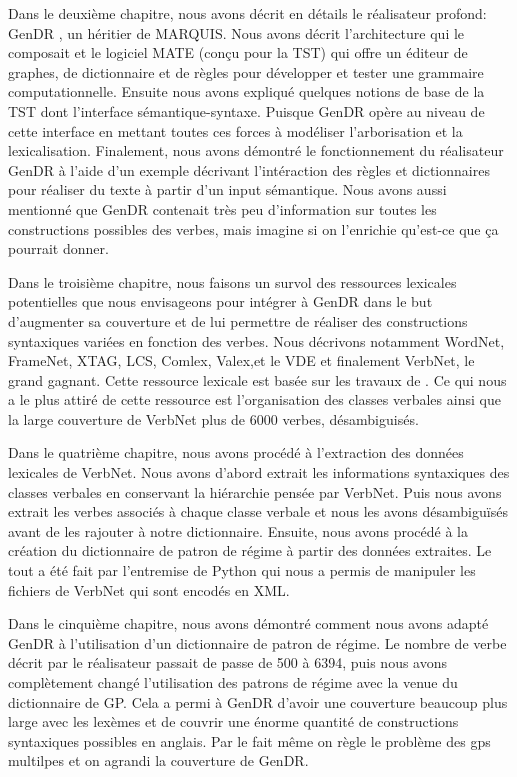 Dans le deuxième chapitre, nous avons décrit en détails le réalisateur profond: GenDR \citep{lareau18}, un héritier de MARQUIS. Nous avons décrit l'architecture qui le composait et le logiciel MATE  (conçu pour la TST) qui offre un éditeur de graphes, de dictionnaire et de règles pour développer et tester une grammaire computationnelle. Ensuite nous avons expliqué quelques notions de base de la TST dont l'interface sémantique-syntaxe. Puisque GenDR opère au niveau de cette interface en mettant toutes ces forces à modéliser l'arborisation et la lexicalisation. Finalement, nous avons démontré le fonctionnement du réalisateur GenDR à l'aide d'un exemple décrivant l'intéraction des règles et dictionnaires pour réaliser du texte à partir d'un input sémantique. Nous avons aussi mentionné que GenDR contenait très peu d'information sur toutes les constructions possibles des verbes, mais imagine si on l'enrichie qu'est-ce que ça pourrait donner.

Dans le troisième chapitre, nous faisons un survol des ressources lexicales potentielles que nous envisageons pour intégrer à GenDR dans le but d'augmenter sa couverture et de lui permettre de réaliser des constructions syntaxiques variées en fonction des verbes. Nous décrivons notamment WordNet, FrameNet, XTAG, LCS, Comlex, Valex,et le VDE et finalement VerbNet, le grand gagnant. Cette ressource lexicale est basée sur les travaux de \cite{verb-classes.levin.1993}. Ce qui nous a le plus attiré de cette ressource est l'organisation des classes verbales ainsi que la large couverture de VerbNet plus de 6000 verbes, désambiguisés.

Dans le quatrième chapitre, nous avons procédé à l'extraction des données lexicales de VerbNet. Nous avons d'abord extrait les informations syntaxiques des classes verbales en conservant la hiérarchie pensée par VerbNet. Puis nous avons extrait les verbes associés à chaque classe verbale et nous les avons désambiguïsés avant de les rajouter à notre dictionnaire. Ensuite, nous avons procédé à la création du dictionnaire de patron de régime à partir des données extraites. Le tout a été fait par l'entremise de Python qui nous a permis de manipuler les fichiers de VerbNet qui sont encodés en XML.

Dans le cinquième chapitre, nous avons démontré comment nous avons adapté GenDR à l'utilisation d'un dictionnaire de patron de régime. Le nombre de verbe décrit par le réalisateur passait de passe de 500 à 6394, puis nous avons complètement changé l'utilisation des patrons de régime avec la venue du dictionnaire de \ac{GP}. Cela a permi à GenDR d'avoir une couverture beaucoup plus large avec les lexèmes et de couvrir une énorme quantité de constructions syntaxiques possibles en anglais. Par le fait même on règle le problème des gps multilpes et on agrandi la couverture de GenDR. 
	
